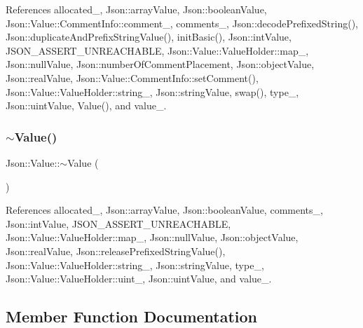 References allocated\+\_\+, Json\+::array\+Value, Json\+::boolean\+Value, Json\+::\+Value\+::\+Comment\+Info\+::comment\+\_\+, comments\+\_\+, Json\+::decode\+Prefixed\+String(), Json\+::duplicate\+And\+Prefix\+String\+Value(), init\+Basic(), Json\+::int\+Value, J\+S\+O\+N\+\_\+\+A\+S\+S\+E\+R\+T\+\_\+\+U\+N\+R\+E\+A\+C\+H\+A\+B\+LE, Json\+::\+Value\+::\+Value\+Holder\+::map\+\_\+, Json\+::null\+Value, Json\+::number\+Of\+Comment\+Placement, Json\+::object\+Value, Json\+::real\+Value, Json\+::\+Value\+::\+Comment\+Info\+::set\+Comment(), Json\+::\+Value\+::\+Value\+Holder\+::string\+\_\+, Json\+::string\+Value, swap(), type\+\_\+, Json\+::uint\+Value, Value(), and value\+\_\+.

\mbox{\label{classJson_1_1Value_a287dea48da3912d02756735bf677b27b_a287dea48da3912d02756735bf677b27b}} 
\subsubsection{\texorpdfstring{$\sim$\+Value()}{~Value()}}
{\footnotesize\ttfamily Json\+::\+Value\+::$\sim$\+Value (\begin{DoxyParamCaption}{ }\end{DoxyParamCaption})}



References allocated\+\_\+, Json\+::array\+Value, Json\+::boolean\+Value, comments\+\_\+, Json\+::int\+Value, J\+S\+O\+N\+\_\+\+A\+S\+S\+E\+R\+T\+\_\+\+U\+N\+R\+E\+A\+C\+H\+A\+B\+LE, Json\+::\+Value\+::\+Value\+Holder\+::map\+\_\+, Json\+::null\+Value, Json\+::object\+Value, Json\+::real\+Value, Json\+::release\+Prefixed\+String\+Value(), Json\+::\+Value\+::\+Value\+Holder\+::string\+\_\+, Json\+::string\+Value, type\+\_\+, Json\+::\+Value\+::\+Value\+Holder\+::uint\+\_\+, Json\+::uint\+Value, and value\+\_\+.



\subsection{Member Function Documentation}
\mbox{\label{classJson_1_1Value_a7e49ac977e4bcf59745a09d426669f75_a7e49ac977e4bcf59745a09d426669f75}} 
